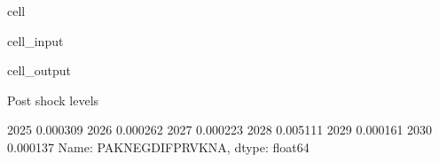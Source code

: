 \documentclass[letterpaper,10pt,english]{jupyterBook}
\begin{document}
\begin{sphinxuseclass}{cell}\begin{sphinxVerbatimInput}

\begin{sphinxuseclass}{cell_input}
\begin{sphinxVerbatim}[commandchars=\\\{\}]

\PYG{p}{[}\PYG{p}{]}
\end{sphinxVerbatim}

\end{sphinxuseclass}\end{sphinxVerbatimInput}
\begin{sphinxVerbatimOutput}

\begin{sphinxuseclass}{cell_output}
\begin{sphinxVerbatim}[commandchars=\\\{\}]
Post shock levels
\end{sphinxVerbatim}

\begin{sphinxVerbatim}[commandchars=\\\{\}]
2025   \PYGZhy{}0.000309
2026   \PYGZhy{}0.000262
2027   \PYGZhy{}0.000223
2028    0.005111
2029   \PYGZhy{}0.000161
2030   \PYGZhy{}0.000137
Name: PAKNEGDIFPRVKN\PYGZus{}A, dtype: float64
\end{sphinxVerbatim}

\end{sphinxuseclass}\end{sphinxVerbatimOutput}

\end{sphinxuseclass}
\end{document}
